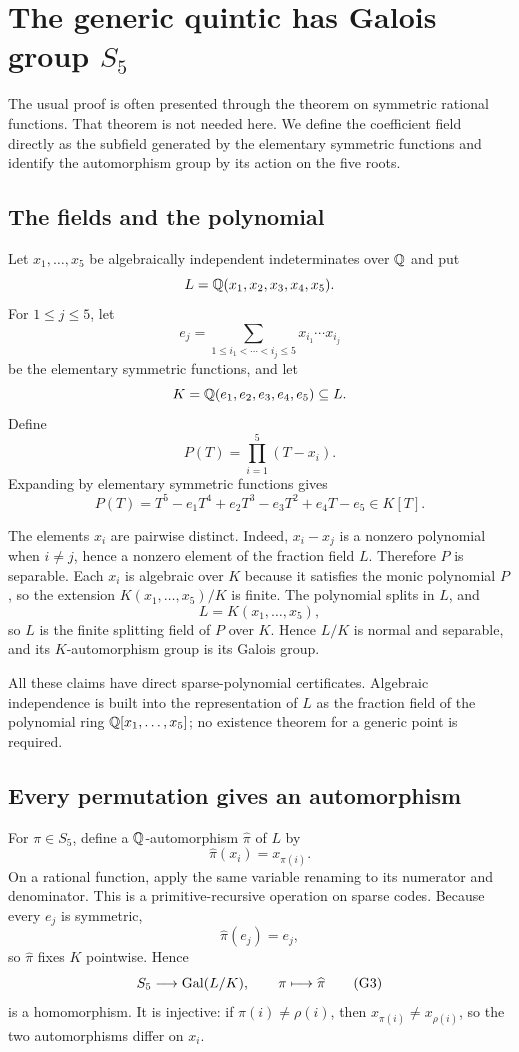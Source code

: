 \section{The generic quintic has Galois group \texorpdfstring{$S_5$}{S5}}
\label{sec:generic-quintic}

The usual proof is often presented through the theorem on symmetric rational
functions.  That theorem is not needed here.  We define the coefficient field
directly as the subfield generated by the elementary symmetric functions and
identify the automorphism group by its action on the five roots.

\subsection{The fields and the polynomial}

Let $x_1,\ldots,x_5$ be algebraically independent indeterminates over $\mathbb Q$ and
put
\[
 L=\mathbb Q(x_1,x_2,x_3,x_4,x_5).
\]
For $1\le j\le5$, let
\[
 e_j=\sum_{1\le i_1<\cdots<i_j\le5}
       x_{i_1}\cdots x_{i_j}
\]
be the elementary symmetric functions, and let
\[
 K=\mathbb Q(e_1,e_2,e_3,e_4,e_5)\subseteq L.
\]
Define
\[
 P(T)=\prod_{i=1}^{5}(T-x_i).
 \tag{G1}\label{eq:generic-product}
\]
Expanding by elementary symmetric functions gives
\[
 P(T)=T^5-e_1T^4+e_2T^3-e_3T^2+e_4T-e_5\in K[T].
 \tag{G2}\label{eq:generic-coefficients}
\]

The elements $x_i$ are pairwise distinct.  Indeed, $x_i-x_j$ is a nonzero
polynomial when $i\ne j$, hence a nonzero element of the fraction field $L$.
Therefore $P$ is separable.  Each $x_i$ is algebraic over $K$ because it
satisfies the monic polynomial $P$, so the extension
$K(x_1,\ldots,x_5)/K$ is finite.  The polynomial splits in $L$, and
\[
 L=K(x_1,\ldots,x_5),
\]
so $L$ is the finite splitting field of $P$ over $K$.  Hence $L/K$ is normal
and separable, and its $K$-automorphism group is its Galois group.

All these claims have direct sparse-polynomial certificates.  Algebraic
independence is built into the representation of $L$ as the fraction field of
the polynomial ring $\mathbb Q[x_1,\ldots,x_5]$; no existence theorem for a generic
point is required.

\subsection{Every permutation gives an automorphism}

For $\pi\in S_5$, define a $\mathbb Q$-automorphism $\widehat\pi$ of $L$ by
\[
 \widehat\pi(x_i)=x_{\pi(i)}.
\]
On a rational function, apply the same variable renaming to its numerator and
denominator.  This is a primitive-recursive operation on sparse codes.
Because every $e_j$ is symmetric,
\[
 \widehat\pi(e_j)=e_j,
\]
so $\widehat\pi$ fixes $K$ pointwise.  Hence
\[
 S_5\longrightarrow\operatorname{Gal}(L/K),
 \qquad
 \pi\longmapsto\widehat\pi
 \tag{G3}\label{eq:S5-to-Gal}
\]
is a homomorphism.  It is injective: if $\pi(i)\ne\rho(i)$, then
$x_{\pi(i)}\ne x_{\rho(i)}$, so the two automorphisms differ on $x_i$.

